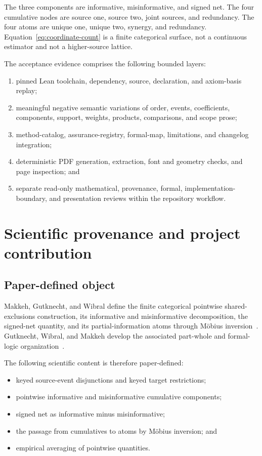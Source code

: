 \documentclass[11pt]{article}
\theoremstyle{definition}
\begin{document}
The three components are informative, misinformative, and signed net.  The four cumulative nodes
are source one, source two, joint sources, and redundancy.  The four atoms are unique one, unique
two, synergy, and redundancy.  Equation~\eqref{eq:coordinate-count} is a finite categorical
surface, not a continuous estimator and not a higher-source lattice.

The acceptance evidence comprises the following bounded layers:
\begin{enumerate}[leftmargin=*]
  \item pinned Lean toolchain, dependency, source, declaration, and axiom-basis replay;
  \item meaningful negative semantic variations of order, events, coefficients, components,
        support, weights, products, comparisons, and scope prose;
  \item method-catalog, assurance-registry, formal-map, limitations, and changelog integration;
  \item deterministic PDF generation, extraction, font and geometry checks, and page inspection;
        and
  \item separate read-only mathematical, provenance, formal, implementation-boundary, and
        presentation reviews within the repository workflow.
\end{enumerate}

\section{Scientific provenance and project contribution}

\subsection{Paper-defined object}

Makkeh, Gutknecht, and Wibral define the finite categorical pointwise shared-exclusions
construction, its informative and misinformative decomposition, the signed-net quantity, and its
partial-information atoms through M\"obius inversion~\cite{mgw2021}.  Gutknecht, Wibral, and
Makkeh develop the associated part-whole and formal-logic organization~\cite{gwm2021}.

The following scientific content is therefore paper-defined:
\begin{itemize}[leftmargin=*]
  \item keyed source-event disjunctions and keyed target restrictions;
  \item pointwise informative and misinformative cumulative components;
  \item signed net as informative minus misinformative;
  \item the passage from cumulatives to atoms by M\"obius inversion; and
  \item empirical averaging of pointwise quantities.
\end{itemize}
\end{document}
